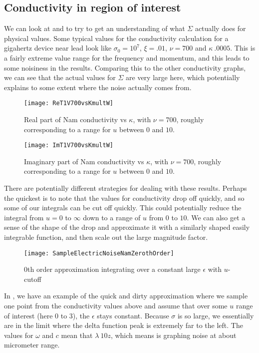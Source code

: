 \documentclass[11pt]{article}
\begin{document}
	\subsection{Conductivity in region of interest} \label{subsec:sample:namresult}
	We can look at  and  to try to get an understanding of what $\Sigma$ actually does for physical values.
	Some typical values for the conductivity calculation for a gigahertz device near lead look like $\sigma_0 = 10^7$, $\xi = .01$, $\nu = 700$ and $\kappa ~ .0005$.
	This is a fairly extreme value range for the frequency and momentum, and this leads to some noisiness in the results.
	Comparing this to the other conductivity graphs, we can see that the actual values for $\Sigma$ are very large here, which potentially explains to some extent where the noise actually comes from.

	\begin{figure}[htp]
		\centering
		\texttt{[image: ReT1V700vsKmultW]}
		\caption{Real part of Nam conductivity vs $\kappa$, with $\nu = 700$, roughly corresponding to a range for $u$ between $0$ and $10$.} \label{fig:ConductivityRe}
	\end{figure}

	\begin{figure}[htp]
		\centering
		\texttt{[image: ImT1V700vsKmultW]}
		\caption{Imaginary part of Nam conductivity vs $\kappa$, with $\nu = 700$, roughly corresponding to a range for $u$ between $0$ and $10$.} \label{fig:ConductivityIm}
	\end{figure}

	There are potentially different strategies for dealing with these results.
	Perhaps the quickest is to note that the values for conductivity drop off quickly, and so some of our integrals can be cut off quickly.
	This could potentially reduce the integral from $u = 0$ to $\infty$ down to a range of $u$ from $0$ to $10$.
	We can also get a sense of the shape of the drop and approximate it with a similarly shaped easily integrable function, and then scale out the large magnitude factor.

	\begin{figure}[htp]
		\centering
		\texttt{[image: SampleElectricNoiseNamZerothOrder]}
		\caption{0th order approximation integrating over a constant large $\epsilon$ with $u$-cutoff} \label{fig:NamZerothOrder}
	\end{figure}

	In , we have an example of the quick and dirty approximation where we sample one point from the conductivity values above and assume that over some $u$ range of interest (here $0$ to $3$), the $\epsilon$ stays constant.
	Because $\sigma$ is so large, we essentially are in the limit where the delta function peak is extremely far to the left.
	The values for $\omega$ and $c$ mean that $\lambda ~ 10 z$, which means  is graphing noise at about micrometer range.

	\newpage
	\listoftodos
	\newpage
	\printbibliography
\end{document}
